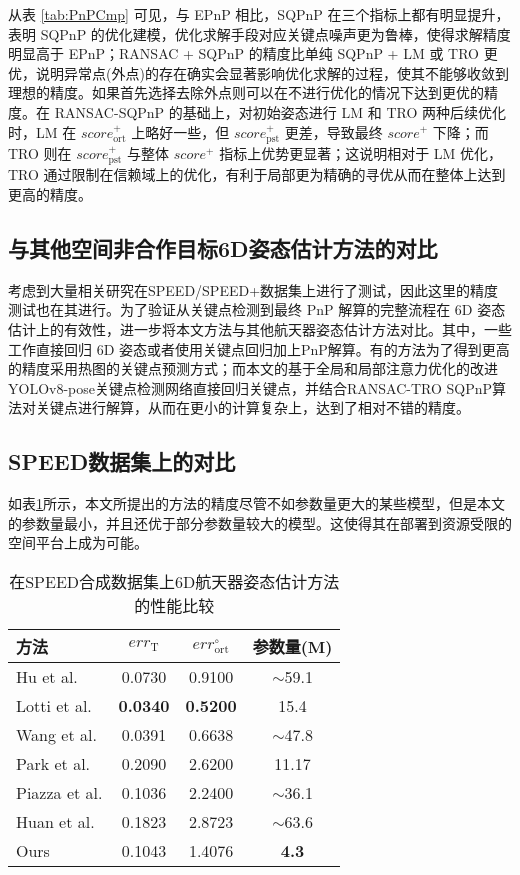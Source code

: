 从表 \ref{tab:PnPCmp} 可见，与 EPnP 相比，SQPnP 在三个指标上都有明显提升，表明 SQPnP 的优化建模，优化求解手段对应关键点噪声更为鲁棒，使得求解精度明显高于 EPnP；RANSAC + SQPnP 的精度比单纯 SQPnP + LM 或 TRO 更优，说明异常点(外点)的存在确实会显著影响优化求解的过程，使其不能够收敛到理想的精度。如果首先选择去除外点则可以在不进行优化的情况下达到更优的精度。在 RANSAC-SQPnP 的基础上，对初始姿态进行 LM 和 TRO 两种后续优化时，LM 在 $score_{\text{ort}}^+$ 上略好一些，但 $score_{\text{pst}}^+$ 更差，导致最终 $score^+$ 下降；而 TRO 则在 $score_{\text{pst}}^+$ 与整体 $score^+$ 指标上优势更显著；这说明相对于 LM 优化，TRO 通过限制在信赖域上的优化，有利于局部更为精确的寻优从而在整体上达到更高的精度。


\subsection{与其他空间非合作目标6D姿态估计方法的对比}
\label{sec:RANSAC-TRO-SQPnP:OthersCompare}
考虑到大量相关研究在SPEED/SPEED+数据集上进行了测试，因此这里的精度测试也在其进行。为了验证从关键点检测到最终 PnP 解算的完整流程在 6D 姿态估计上的有效性，进一步将本文方法与其他航天器姿态估计方法对比。其中，一些工作直接回归 6D 姿态或者使用关键点回归加上PnP解算。有的方法为了得到更高的精度采用热图的关键点预测方式；而本文的基于全局和局部注意力优化的改进YOLOv8-pose关键点检测网络直接回归关键点，并结合RANSAC-TRO SQPnP算法对关键点进行解算，从而在更小的计算复杂上，达到了相对不错的精度。


\subsection{SPEED数据集上的对比}
如表\ref{tab:SPEED_Comparison}所示，本文所提出的方法的精度尽管不如参数量更大的某些模型，但是本文的参数量最小，并且还优于部分参数量较大的模型。这使得其在部署到资源受限的空间平台上成为可能。
\begin{table}[htbp]
	\centering
	\caption{在SPEED合成数据集上6D航天器姿态估计方法的性能比较}
	\label{tab:SPEED_Comparison}
	\begin{tabular}{lccc}
		\toprule
		方法 & $err_{\text{T}}$ & $err_{\text{ort}}^{\circ}$ & 参数量(M) \\
		\midrule
		Hu et al.\citep{gerard2019segmentation} & 0.0730 & 0.9100 & $\sim$59.1 \\
		Lotti et al.\citep{lotti2022investigating} & \textbf{0.0340} & \textbf{0.5200} & 15.4 \\
		Wang et al.\citep{wang2022revisiting} & 0.0391 & 0.6638 & $\sim$47.8 \\
		Park et al.\citep{park2019towards} & 0.2090 & 2.6200 & 11.17 \\
		Piazza et al.\citep{piazza2021deep} & 0.1036 & 2.2400 & $\sim$36.1 \\
		Huan et al.\citep{huan2020pose} & 0.1823 & 2.8723 & $\sim$63.6 \\
		Ours & 0.1043 & 1.4076 & \textbf{4.3} \\
		\bottomrule
	\end{tabular}
\end{table}

